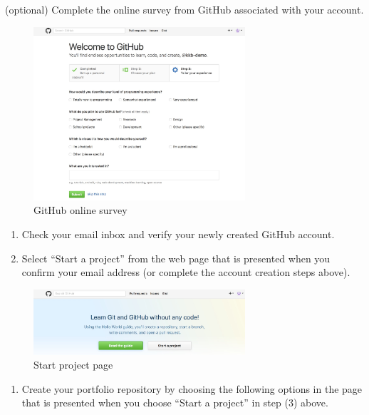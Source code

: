 \documentclass[]{book}
\providecommand{\tightlist}{%
  \setlength{\itemsep}{0pt}\setlength{\parskip}{0pt}}
\begin{document}
(optional) Complete the online survey from GitHub associated with your
account.

\begin{figure}[htbp]
\centering
\includegraphics[width=0.70000\textwidth]{images/github_step3.jpg}
\caption{GitHub online survey}
\end{figure}

\begin{enumerate}
\def\labelenumi{\arabic{enumi}.}
\setcounter{enumi}{1}
\item
  Check your email inbox and verify your newly created GitHub account.
\item
  Select ``Start a project'' from the web page that is presented when
  you confirm your email address (or complete the account creation steps
  above).
\end{enumerate}

\begin{figure}[htbp]
\centering
\includegraphics[width=0.70000\textwidth]{images/github_start.jpg}
\caption{Start project page}
\end{figure}

\begin{enumerate}
\def\labelenumi{\arabic{enumi}.}
\setcounter{enumi}{3}
\tightlist
\item
  Create your portfolio repository by choosing the following options in
  the page that is presented when you choose ``Start a project'' in step
  (3) above.
\end{enumerate}
\end{document}
